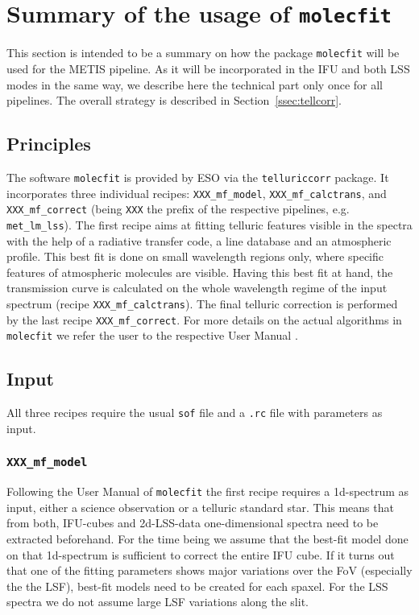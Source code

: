 \section{Summary of the usage of \texttt{molecfit}}\label{app:mf}
This section is intended to be a summary on how the package \texttt{molecfit} will be used for the \ac{METIS} pipeline. As it will be incorporated in the \ac{IFU} and both \ac{LSS} modes in the same way, we describe here the technical part only once for all pipelines. The overall strategy is described in Section~\ref{ssec:tellcorr}.

\subsection{Principles}\label{app:mf_principles}
The software \texttt{molecfit} is provided by \ac{ESO} via the \texttt{telluriccorr} package. It incorporates three individual recipes: \texttt{XXX\_mf\_model}, \texttt{XXX\_mf\_calctrans}, and \texttt{XXX\_mf\_correct} (being \texttt{XXX} the prefix of the respective pipelines, e.g. \texttt{met\_lm\_lss}). The first recipe aims at fitting telluric features visible in the spectra with the help of a radiative transfer code, a line database and an atmospheric profile. This best fit is done on small wavelength regions only, where specific features of atmospheric molecules are visible. Having this best fit at hand, the transmission curve is calculated on the whole wavelength regime of the input spectrum (recipe \texttt{XXX\_mf\_calctrans}). The final telluric correction is performed by the last recipe \texttt{XXX\_mf\_correct}. For more details on the actual algorithms in \texttt{molecfit} we refer the user to the respective User Manual \cite{molecfit}.\\

\subsection{Input}\label{app:mf_input}
All three recipes require the usual \texttt{sof} file and a \texttt{.rc} file with parameters as input.
\subsubsection{\texttt{XXX\_mf\_model}}
Following the User Manual of \texttt{molecfit}\cite{molecfit} the first recipe requires a 1d-spectrum as input, either a science observation or a telluric standard star. This means that from both, \ac{IFU}-cubes and 2d-\ac{LSS}-data one-dimensional spectra need to be extracted beforehand. For the time being we assume that the best-fit model done on that 1d-spectrum is sufficient to correct the entire \ac{IFU} cube. If it turns out that one of the fitting parameters shows major variations over the \ac{FoV} (especially the the \ac{LSF}), best-fit models need to be created for each spaxel. For the \ac{LSS} spectra we do not assume large \ac{LSF} variations along the slit. \\
